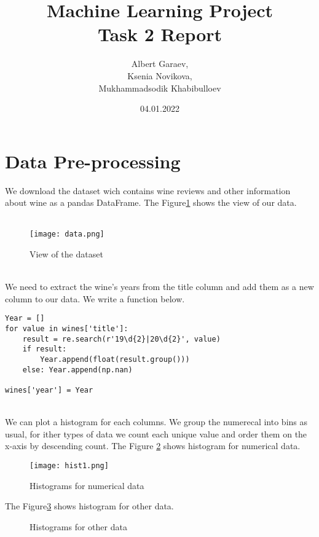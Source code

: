 \documentclass[a4paper, twoside, english]{article}
\title{Machine Learning Project\\Task 2 Report}
\author{Albert Garaev,\\ Ksenia Novikova,\\ Mukhammadsodik Khabibulloev }
\date{04.01.2022}
\begin{document}
\maketitle


\section{Data Pre-processing}

We download the dataset wich contains  wine reviews and other information about wine as a pandas DataFrame. The Figure\ref{fig:data} shows the view of our data.\\
~\\
\begin{figure}[h!]
	\centerline{\texttt{[image: data.png]}}
	\caption[data]{View of the dataset}
	\label{fig:data}
\end{figure}\\


We need to extract the wine's years from the title column and add them as a new column to our data. We write a function below.\\
\begin{lstlisting}[language=iPython]
Year = []
for value in wines['title']:
	result = re.search(r'19\d{2}|20\d{2}', value)
	if result:
		Year.append(float(result.group()))
	else: Year.append(np.nan)

wines['year'] = Year
\end{lstlisting}


~\\
We can plot a histogram for each columns. We group the numerecal into bins as usual, for ither types of data we count each unique value and order them on the x-axis by descending count. The Figure \ref{fig:hist1} shows histogram for numerical data.\\


\begin{figure}[h!]
	\centerline{\texttt{[image: hist1.png]}}
	\caption[hist]{Histograms for numerical data}
	\label{fig:hist1}
\end{figure}
\newpage


The Figure\ref{fig:hist2} shows histogram for other data.\\
 \begin{figure}[h!]
	\centerline
	{
		\qquad
	}
	\caption[hist]{Histograms for other data}
	\label{fig:hist2}
\end{figure}
\end{document}
